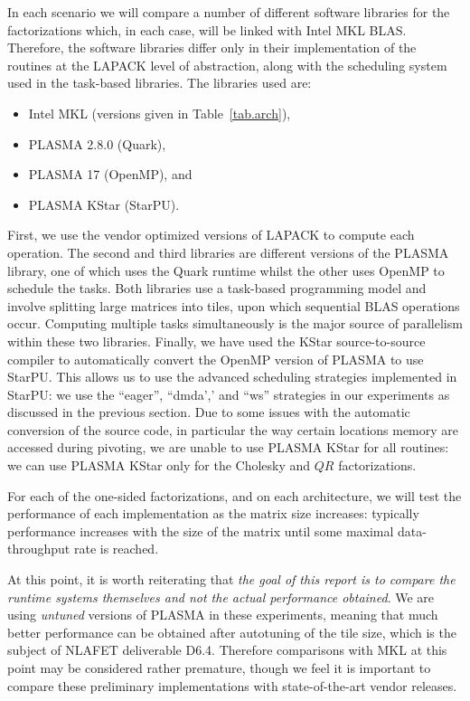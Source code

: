 \documentclass[a4paper,12pt]{article}
\begin{document}
In each scenario we will compare a number of different software libraries
for the factorizations which,
in each case,
will be linked with Intel MKL BLAS.
Therefore, the software libraries differ only in their
implementation of the routines at the LAPACK level of abstraction,
along with the scheduling system used in the task-based libraries.
The libraries used are:
\begin{itemize}
\item Intel MKL (versions given in Table~\ref{tab.arch}),
\item PLASMA 2.8.0 (Quark),
\item PLASMA 17 (OpenMP), and
\item PLASMA KStar (StarPU).
\end{itemize}

First,
we use the vendor optimized versions of LAPACK to compute each operation.
The second and third libraries are different versions of the PLASMA
library,
one of which uses the Quark runtime whilst the other uses OpenMP
to schedule the tasks.
Both libraries use a task-based programming model and involve
splitting large matrices into tiles,
upon which sequential BLAS operations occur.
Computing multiple tasks simultaneously is the major source of parallelism
within these two libraries.
Finally,
we have used the KStar source-to-source compiler to automatically
convert the OpenMP version of PLASMA to use StarPU.
This allows us to use the advanced scheduling strategies implemented
in StarPU:
we use the ``eager'', ``dmda',' and ``ws'' strategies in our
experiments as discussed in the previous section.
Due to some issues with the automatic conversion of the source code,
in particular the way certain locations memory are accessed during pivoting,
we are unable to use PLASMA KStar for all routines:
we can use PLASMA KStar only for the Cholesky and $QR$ factorizations.

For each of the one-sided factorizations,
and on each architecture,
we will test the performance of each implementation
as the matrix size increases:
typically performance increases with the size of the matrix until
some maximal data-throughput rate is reached.

At this point,
it is worth reiterating that \emph{the goal of this report is to
compare the runtime systems themselves
and not the actual performance obtained}.
We are using \emph{untuned} versions of PLASMA in these experiments,
meaning that much better performance can be obtained
after autotuning of the tile size,
which is the subject of NLAFET deliverable D6.4.
Therefore comparisons with MKL at this point
may be considered rather premature,
though we feel it is important to compare these preliminary implementations
with state-of-the-art vendor releases.
\end{document}
